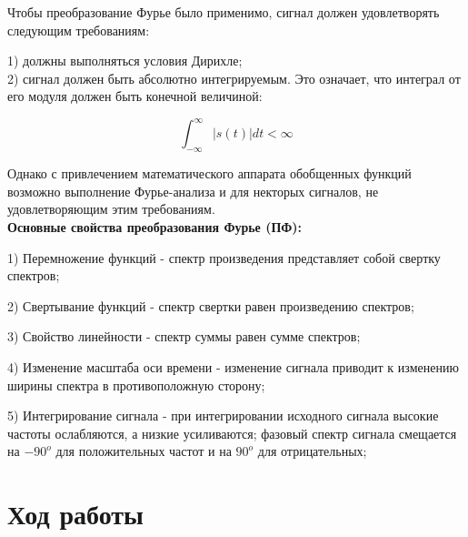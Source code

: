 \documentclass[12pt,a4paper]{scrartcl}
\begin{document}
Чтобы преобразование Фурье было применимо, сигнал должен удовлетворять следующим требованиям:

1) должны выполняться условия Дирихле;\\
2) сигнал должен быть абсолютно интегрируемым. Это означает, что интеграл от его модуля должен быть конечной величиной:

$$\int_{-\infty}^\infty|s(t)|dt<\infty$$

Однако с привлечением математического аппарата обобщенных функций возможно выполнение Фурье-анализа и для некторых сигналов, не удовлетворяющим этим требованиям.
\\

\textbf{Основные свойства преобразования Фурье (ПФ):}

1) Перемножение функций - спектр произведения представляет собой свертку спектров;

2) Свертывание функций - спектр свертки равен произведению спектров;

3) Свойство линейности - спектр суммы равен сумме спектров;

4) Изменение масштаба оси времени - изменение сигнала приводит к изменению ширины спектра в противоположную сторону;

5) Интегрирование сигнала - при интегрировании исходного сигнала высокие частоты ослабляются, а низкие усиливаются; фазовый спектр сигнала смещается на $-90^o$ для положительных частот и на $90^o$ для отрицательных;


\newpage

\section{Ход работы}
\label{sec:work}
\end{document}

